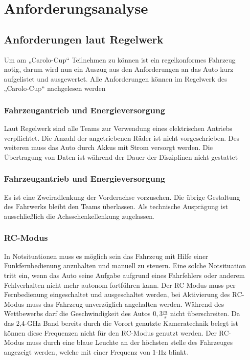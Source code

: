 
\chapter{Anforderungsanalyse}

\section{Anforderungen laut Regelwerk}
Um am „Carolo-Cup“ Teilnehmen zu können ist ein regelkonformes Fahrzeug notig, darum wird nun ein Auszug aus den Anforderungen an das Auto kurz aufgelistet und ausgewertet.
Alle Anforderungen können im Regelwerk des „Carolo-Cup“ nachgelesen werden \cite{website-carolo-cup-regelwerk}


\subsection{Fahrzeugantrieb und Energieversorgung}
Laut Regelwerk sind alle Teams zur Verwendung eines elektrischen Antriebs verpflichtet.
Die Anzahl der angetriebenen Räder ist nicht vorgeschrieben.
Des weiteren muss das Auto durch Akkus mit Strom versorgt werden.
Die Übertragung von Daten ist während der Dauer der Disziplinen nicht gestattet

\subsection{Fahrzeugantrieb und Energieversorgung}
Es ist eine Zweiradlenkung der Vorderachse vorzusehen. Die übrige Gestaltung des Fahrwerks bleibt den Teams überlassen. Als
technische Ausprägung ist ausschließlich die Achsschenkellenkung zugelassen.

\subsection{RC-Modus}
In Notsituationen muss es möglich sein das Fahrzeug mit Hilfe einer Funkfernbedienung anzuhalten und manuell zu steuern. Eine solche Notsituation tritt ein, wenn
das Auto seine Aufgabe aufgrund eines Fahrfehlers oder anderem Fehlverhalten nicht mehr autonom fortführen kann.
Der RC-Modus muss per Fernbedienung eingeschaltet und ausgeschaltet werden, bei Aktivierung des RC-Modus muss das Fahrzeug unverzüglich angehalten werden.
Während des Wettbewerbs darf die Geschwindigkeit des Autos $0,3\frac{m}{s}$ nicht überschreiten.
Da das 2,4-GHz Band bereits durch die Vorort genutzte Kameratechnik belegt ist können diese Frequenzen nicht für den RC-Modus genutzt werden.
Der RC-Modus muss durch eine blaue Leuchte an der höchsten stelle des Fahrzeuges angezeigt werden, welche mit einer Frequenz von 1-Hz blinkt.

